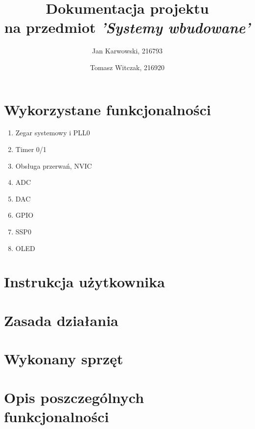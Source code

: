 ﻿\documentclass{article}
\author{
    Jan Karwowski, 216793
        \and
    Tomasz Witczak, 216920
}
\title{\textbf{Dokumentacja projektu}\\na przedmiot \textit{'Systemy wbudowane'}}
\begin{document}
\maketitle
\newpage

\section{Wykorzystane funkcjonalności}
\begin{enumerate}
    \item Zegar systemowy i PLL0
    \item Timer 0/1
    \item Obsługa przerwań, NVIC
    \item ADC
    \item DAC
    \item GPIO
    \item SSP0
    \item OLED
\end{enumerate}

\section{Instrukcja użytkownika}
\label{instrukcja_uzytkownika}


\section{Zasada działania}
\label{zasada_dzialania}


\section{Wykonany sprzęt}
\label{wykonany_sprzet}


\section{Opis poszczególnych funkcjonalności}








\end{document}
